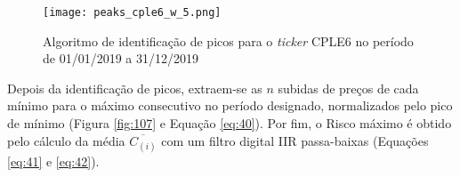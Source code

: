 \begin{itemize}
    \begin{figure}[h]
        \texttt{[image: peaks\_cple6\_w\_5.png]}
        \centering
        \caption{Algoritmo de identificação de picos para o \textit{ticker} CPLE6 no período de 01/01/2019 a 31/12/2019}
        \label{fig:106}
    \end{figure}



    Depois da identificação de picos, extraem-se as \begin{math} n \end{math} subidas de preços de cada mínimo para o máximo consecutivo no período designado, normalizados pelo pico de mínimo (Figura \ref{fig:107} e Equação \ref{eq:40}). Por fim, o Risco máximo é obtido pelo cálculo da média \begin{math} \overline{C_{(i)}} \end{math} com um filtro digital IIR passa-baixas (Equações \ref{eq:41} e \ref{eq:42}).


\end{itemize}
